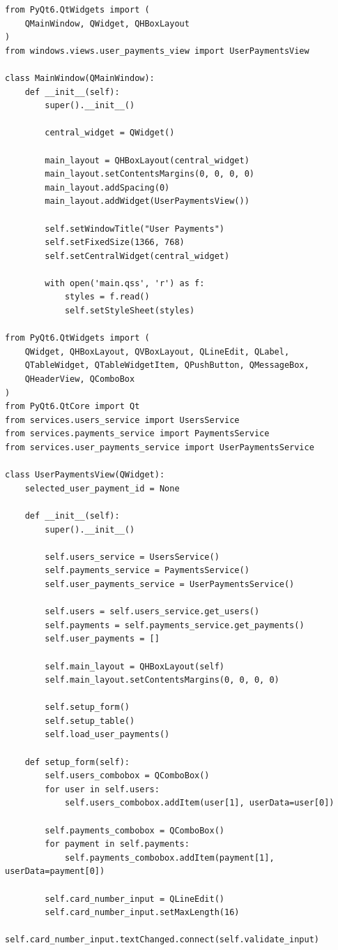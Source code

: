 \documentclass[a4paper,14pt]{extarticle}
\begin{document}
\begin{Verbatim}[tabsize=4,fontsize=\small]
from PyQt6.QtWidgets import (
    QMainWindow, QWidget, QHBoxLayout
)
from windows.views.user_payments_view import UserPaymentsView

class MainWindow(QMainWindow):
    def __init__(self):
        super().__init__()

        central_widget = QWidget()

        main_layout = QHBoxLayout(central_widget)
        main_layout.setContentsMargins(0, 0, 0, 0)
        main_layout.addSpacing(0)
        main_layout.addWidget(UserPaymentsView())

        self.setWindowTitle("User Payments")
        self.setFixedSize(1366, 768)
        self.setCentralWidget(central_widget)

        with open('main.qss', 'r') as f:
            styles = f.read()
            self.setStyleSheet(styles)

from PyQt6.QtWidgets import (
    QWidget, QHBoxLayout, QVBoxLayout, QLineEdit, QLabel,
    QTableWidget, QTableWidgetItem, QPushButton, QMessageBox,
    QHeaderView, QComboBox
)
from PyQt6.QtCore import Qt
from services.users_service import UsersService
from services.payments_service import PaymentsService
from services.user_payments_service import UserPaymentsService

class UserPaymentsView(QWidget):
    selected_user_payment_id = None

    def __init__(self):
        super().__init__()

        self.users_service = UsersService()
        self.payments_service = PaymentsService()
        self.user_payments_service = UserPaymentsService()

        self.users = self.users_service.get_users()
        self.payments = self.payments_service.get_payments()
        self.user_payments = []

        self.main_layout = QHBoxLayout(self)
        self.main_layout.setContentsMargins(0, 0, 0, 0)

        self.setup_form()
        self.setup_table()
        self.load_user_payments()

    def setup_form(self):
        self.users_combobox = QComboBox()
        for user in self.users:
            self.users_combobox.addItem(user[1], userData=user[0])

        self.payments_combobox = QComboBox()
        for payment in self.payments:
            self.payments_combobox.addItem(payment[1], userData=payment[0])

        self.card_number_input = QLineEdit()
        self.card_number_input.setMaxLength(16)
        self.card_number_input.textChanged.connect(self.validate_input)


\end{Verbatim}
\end{document}
